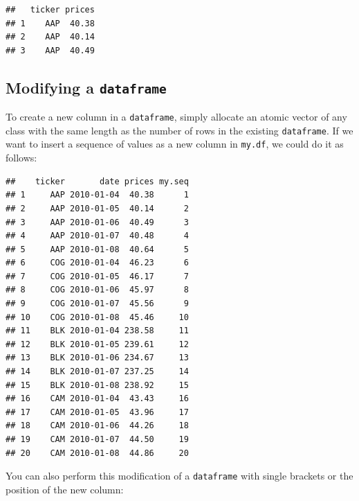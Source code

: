 \documentclass[11pt,]{book}
\newenvironment{Shaded}{\begin{snugshade}}{\end{snugshade}}
\newcommand{\KeywordTok}[1]{\textcolor[rgb]{0.27,0.27,0.27}{\textbf{#1}}}
\newcommand{\DecValTok}[1]{\textcolor[rgb]{0.06,0.06,0.06}{#1}}
\newcommand{\StringTok}[1]{\textcolor[rgb]{0.5,0.5,0.5}{#1}}
\newcommand{\CommentTok}[1]{\textcolor[rgb]{0.56,0.35,0.01}{\textit{#1}}}
\newcommand{\OperatorTok}[1]{\textcolor[rgb]{0.81,0.36,0.00}{\textbf{#1}}}
\newcommand{\NormalTok}[1]{#1}
\begin{document}
\begin{verbatim}
##   ticker prices
## 1    AAP  40.38
## 2    AAP  40.14
## 3    AAP  40.49
\end{verbatim}

\subsection{\texorpdfstring{Modifying a
\texttt{dataframe}}{Modifying a dataframe}}\label{modifying-a-dataframe}

To create a new column in a \texttt{dataframe}, simply allocate an
atomic vector of any class with the same length as the number of rows in
the existing \texttt{dataframe}. If we want to insert a sequence of
values as a new column in \texttt{my.df}, we could do it as follows:

\begin{Shaded}
\end{Shaded}

\begin{verbatim}
##    ticker       date prices my.seq
## 1     AAP 2010-01-04  40.38      1
## 2     AAP 2010-01-05  40.14      2
## 3     AAP 2010-01-06  40.49      3
## 4     AAP 2010-01-07  40.48      4
## 5     AAP 2010-01-08  40.64      5
## 6     COG 2010-01-04  46.23      6
## 7     COG 2010-01-05  46.17      7
## 8     COG 2010-01-06  45.97      8
## 9     COG 2010-01-07  45.56      9
## 10    COG 2010-01-08  45.46     10
## 11    BLK 2010-01-04 238.58     11
## 12    BLK 2010-01-05 239.61     12
## 13    BLK 2010-01-06 234.67     13
## 14    BLK 2010-01-07 237.25     14
## 15    BLK 2010-01-08 238.92     15
## 16    CAM 2010-01-04  43.43     16
## 17    CAM 2010-01-05  43.96     17
## 18    CAM 2010-01-06  44.26     18
## 19    CAM 2010-01-07  44.50     19
## 20    CAM 2010-01-08  44.86     20
\end{verbatim}

You can also perform this modification of a \texttt{dataframe} with
single brackets or the position of the new column:
\end{document}
